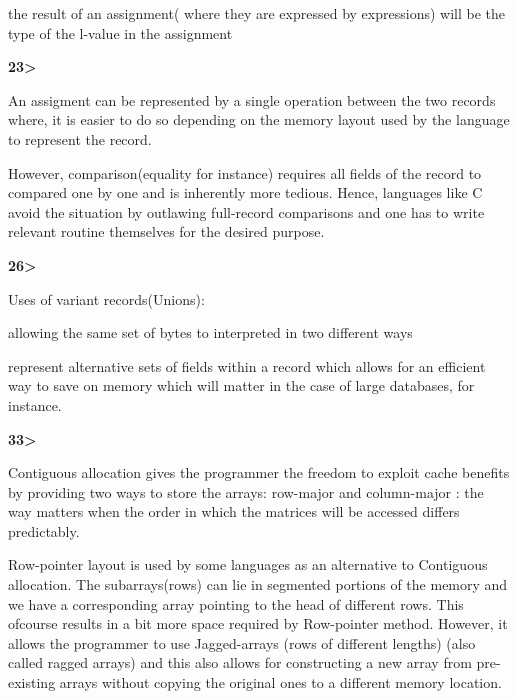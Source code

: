 \documentclass[12pt]{article}
\renewcommand{\_}{\kern-1.5pt\textunderscore\kern-1.5pt}
\begin{document}
the result of an assignment( where they are expressed by expressions) will be the type of the l-value in the assignment \par


\vspace{\baselineskip}
\textbf{23>}\par

An assigment can be represented by a single operation between the two records where, it is easier to do so depending on the memory layout used by the language to represent the record.\par

However, comparison(equality for instance) requires all fields of the record to compared one by one and is inherently more tedious. Hence, languages like C avoid the situation by outlawing full-record comparisons and one has to write relevant routine themselves for the desired purpose. \par


\vspace{\baselineskip}
\textbf{26>}\par

Uses of variant records(Unions):\par

allowing the same set of bytes to interpreted in two different ways\par

represent alternative sets of fields within a record which allows for an efficient way to save on memory which will matter in the case of large databases, for instance.\par


\vspace{\baselineskip}
\textbf{33>}\par

Contiguous allocation gives the programmer the freedom to exploit cache benefits by providing two ways to store the arrays: row-major and column-major : the way matters when the order in which the matrices will be accessed differs predictably.\par

Row-pointer layout is used by some languages as an alternative to Contiguous allocation. The subarrays(rows) can lie in segmented portions of the memory and we have a corresponding array pointing to the head of different rows. This ofcourse results in a bit more space required by Row-pointer method. However, it allows the programmer to use Jagged-arrays (rows of different lengths) (also called ragged arrays) and this also allows for constructing a new array from pre-existing arrays without copying the original ones to a different memory location.\par
\end{document}
